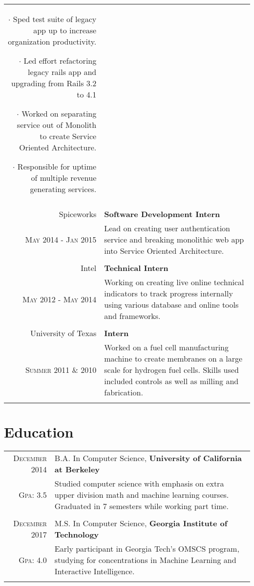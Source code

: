\documentclass[a4paper,10pt]{article}
\begin{document}
\begin{tabular}{r|p{11cm}}
{		 $\cdot$ Sped test suite of legacy app up to increase organization productivity.

		 $\cdot$
		 Led effort refactoring legacy rails app and upgrading from Rails 3.2 to 4.1

		 $\cdot$
		 Worked on separating service out of Monolith to create Service Oriented Architecture.

		 $\cdot$
		 Responsible for uptime of multiple revenue generating services.

	 }
	 \\\multicolumn{2}{c}{} \\

 Spiceworks & \textbf{Software Development Intern} \\
 \textsc{May 2014 - Jan 2015} &
	\footnotesize{
		Lead on creating user authentication service and breaking monolithic web app
		into Service Oriented Architecture.
	}
	\\\multicolumn{2}{c}{} \\

Intel & \textbf{Technical Intern} \\
\textsc{May 2012 - May 2014} &
 \footnotesize{
	 Working on creating live online technical indicators to track progress
	 internally using various database and online tools and frameworks.
 }
 \\\multicolumn{2}{c}{} \\

University of Texas & \textbf{Intern} \\
\textsc{Summer 2011 \& 2010} &
\footnotesize{
	Worked on a fuel cell manufacturing machine to create membranes on a large
	scale for hydrogen fuel cells. Skills used included controls as well as
	milling and fabrication.
}
\\\multicolumn{2}{c}{} \\

\end{tabular}

\section{Education}
\begin{tabular}{rp{11cm}}
 \textsc{December} 2014 & B.A. In Computer Science, \textbf{University of California at Berkeley}\\
 \textsc{Gpa}: 3.5 &
 \footnotesize{
	 Studied computer science with emphasis on extra upper
	 division math and machine learning courses.
	 Graduated in 7 semesters while working part time.
}
	 \\\multicolumn{2}{c}{} \\

	\textsc{December} 2017 & M.S. In Computer Science, \textbf{Georgia Institute of Technology}\\
	\textsc{Gpa}: 4.0 &
	\footnotesize{
Early participant in Georgia Tech's OMSCS program, studying for concentrations
in Machine Learning and Interactive Intelligence.
 }
		\\\multicolumn{2}{c}{} \\

\end{tabular}


\end{document}
